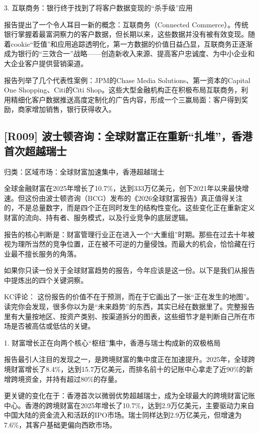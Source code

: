 \documentclass[11pt]{ctexart}
\begin{document}
3. 互联商务：银行终于找到了将客户数据变现的“杀手级”应用

报告提出了一个令人耳目一新的概念：互联商务（Connected Commerce）。传统银行掌握着最富洞察力的客户数据，但长期以来，这些数据并没有被有效变现。随着cookie“贬值”和应用追踪透明化，第一方数据的价值日益凸显，互联商务正逐渐成为银行的“三效合一”战略——创造新收入来源、提高客户忠诚度、为中小企业和大企业客户提供营销渠道。

报告列举了几个代表性案例：JPM的Chase Media Solutions、第一资本的Capital One Shopping、Citi的Citi Shop。这些大型金融机构正在积极布局互联商务，利用精细化客户数据推送高度定制化的广告内容，形成一个三赢局面：客户得到奖励，商家增加销售，银行获得收入。

\subsection{[R009] 波士顿咨询：全球财富正在重新“扎堆”，香港首次超越瑞士}
{\small\color{refgray}归类：区域市场：全球财富加速集中，香港超越瑞士}

全球金融财富在2025年增长了10.7\%，达到333万亿美元，创下2021年以来最快增速。但这份由波士顿咨询（BCG）发布的《2026全球财富报告》真正值得关注的，不是总量数字，而是四个正在同时发生的结构性变化。这些变化正在重新定义财富的流向、持有者、服务模式，以及行业竞争的底层逻辑。

报告的核心判断是：财富管理行业正在进入一个“大重组”时期。那些在过去十年被视为理所当然的竞争位置，正在被不可逆的力量侵蚀。而最大的机会，恰恰藏在行业最不擅长服务的角落。

如果你只读一份关于全球财富趋势的报告，今年应该是这一份。以下是我们从报告中提炼出的四个关键洞察。

KC评论： 这份报告的价值不在于预测，而在于它画出了一张“正在发生的地图”。读完你会发现，很多你以为是“未来趋势”的东西，其实已经在数据里了。完整报告里有大量按地区、按资产类别、按渠道拆分的图表，这些细节才是判断自己所在市场是否被高估或低估的关键。

1. 财富增长正在向两个核心“枢纽”集中，香港与瑞士构成新的双极格局

报告最引人注目的发现之一，是跨境财富的集中度正在加速提升。2025年，全球跨境财富增长了8.4\%，达到15.7万亿美元，而排名前十的记账中心拿走了近90\%的新增跨境资金，并持有超过80\%的存量。

更关键的变化在于：香港首次以微弱优势超越瑞士，成为全球最大的跨境财富记账中心。香港的跨境财富在2025年增长了10.7\%，达到2.9万亿美元，主要驱动力来自中国大陆的资金流入和活跃的IPO市场。瑞士同样达到2.9万亿美元，但增速为7.6\%，其客户基础更偏向西欧市场。
\end{document}
